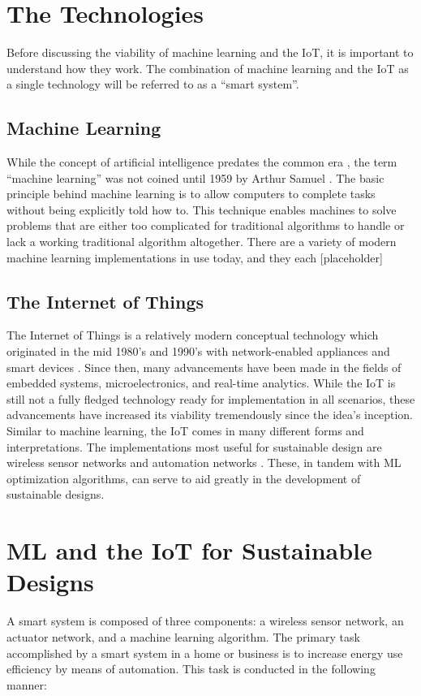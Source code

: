 \documentclass[letterpaper]{article}
\begin{document}
\section{The Technologies} \label{info}
Before discussing the viability of machine learning and the IoT, it is important to understand how they work. The combination of machine learning and the IoT as a single technology will be referred to as a ``smart system''.

\subsection{Machine Learning} \label{MLinfo}
While the concept of artificial intelligence predates the common era \cite{mccorduck04}, the term ``machine learning'' was not coined until 1959 by Arthur Samuel \cite{samuel59}. The basic principle behind machine learning is to allow computers to complete tasks without being explicitly told how to. This technique enables machines to solve problems that are either too complicated for traditional algorithms to handle or lack a working traditional algorithm altogether. There are a variety of modern machine learning implementations in use today, and they each [placeholder]

\subsection{The Internet of Things} \label{IoTinfo}
The Internet of Things is a relatively modern conceptual technology which originated in the mid 1980's and 1990's with network-enabled appliances and smart devices \cite{weiser91}. Since then, many advancements have been made in the fields of embedded systems, microelectronics, and real-time analytics. While the IoT is still not a fully fledged technology ready for implementation in all scenarios, these advancements have increased its viability tremendously since the idea's inception. Similar to machine learning, the IoT comes in many different forms and interpretations. The implementations most useful for sustainable design are wireless sensor networks and automation networks \cite{atzori10}. These, in tandem with ML optimization algorithms, can serve to aid greatly in the development of sustainable designs.

\section{ML and the IoT for Sustainable Designs} \label{main}
A smart system is composed of three components: a wireless sensor network, an actuator network, and a machine learning algorithm. The primary task accomplished by a smart system in a home or business is to increase energy use efficiency by means of automation. This task is conducted in the following manner:
\end{document}
